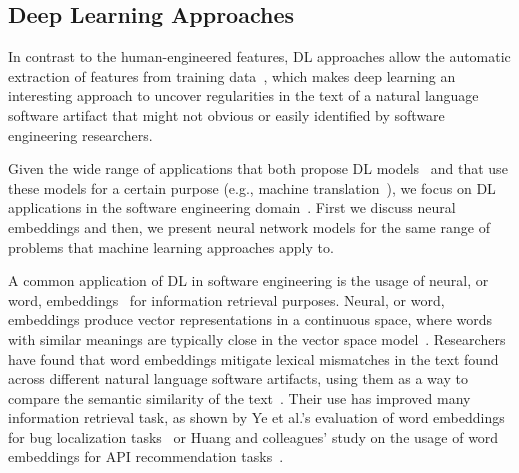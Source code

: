 



\subsection{Deep Learning Approaches}
\label{cp2:deep-learning}





In contrast to the human-engineered features,
\acf{DL} approaches allow the automatic extraction of features 
from training data~\cite{Deng2018, zhang2021deep},
which makes 
deep learning an interesting 
approach to
uncover regularities in the text of a natural language software artifact
that might not obvious or easily identified
by software engineering researchers.




Given the wide range of applications that both propose \acs{DL} models~\cite{} and that use 
these models for a certain purpose (e.g., machine translation~\cite{lopez2008translation}), 
we focus
on \acs{DL} applications in the 
software engineering domain~\cite{ferreira2021, li2018deep, watson2022}.
First we discuss neural embeddings and then, we present 
neural network models 
for the same range of problems 
that machine learning approaches apply to.






A common application of \acs{DL} in software engineering is the usage of neural, or word, embeddings~\cite{Mikolov2013}
for information retrieval purposes. 
Neural, or word, embeddings produce vector representations in a continuous space,
where words with similar meanings are typically close in the vector space model~\cite{harris1954distributional, mikolov2013efficient}. 
Researchers have found that word
embeddings mitigate lexical mismatches in the text found across different 
natural language software artifacts,
using them as a way to compare the semantic similarity of the text~\cite{mihalcea2006}.
Their use has improved many information retrieval task,
as shown by Ye et al.'s evaluation of word embeddings
for bug localization tasks~\cite{Ye2016}
or Huang and colleagues' study on 
the usage of word embeddings for API recommendation tasks~\cite{Huang2018}. 


